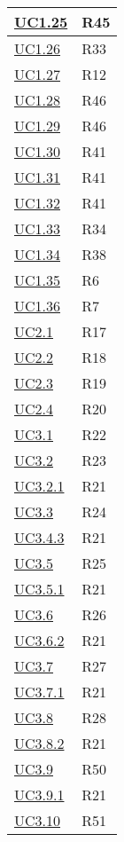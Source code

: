 \begin{longtable}{|P{6cm}|P{6cm}|}
	\hline \hyperref[UC1.25]{UC1.25} & R45 \\
	\hline \hyperref[UC1.26]{UC1.26} & R33 \\
	\hline \hyperref[UC1.27]{UC1.27} & R12 \\
	\hline \hyperref[UC1.28]{UC1.28} & R46 \\
	\hline \hyperref[UC1.29]{UC1.29} & R46 \\
	\hline \hyperref[UC1.30]{UC1.30} & R41 \\
	\hline \hyperref[UC1.31]{UC1.31} & R41 \\
	\hline \hyperref[UC1.32]{UC1.32} & R41 \\
	\hline \hyperref[UC1.33]{UC1.33} & R34 \\
	\hline \hyperref[UC1.34]{UC1.34} & R38 \\
	\hline \hyperref[UC1.35]{UC1.35} & R6 \\
	\hline \hyperref[UC1.36]{UC1.36} & R7 \\	
	\hline \hyperref[UC2.1]{UC2.1} & R17 \\
	\hline \hyperref[UC2.2]{UC2.2} & R18 \\
	\hline \hyperref[UC2.3]{UC2.3} & R19 \\
	\hline \hyperref[UC2.4]{UC2.4} & R20 \\	
	\hline \hyperref[UC3.1]{UC3.1} & R22 \\
	\hline \hyperref[UC3.2]{UC3.2} & R23 \\
	\hline \hyperref[UC3.2.1]{UC3.2.1} & R21 \\
	\hline \hyperref[UC3.3]{UC3.3} & R24 \\
	\hline \hyperref[UC3.4.3]{UC3.4.3} & R21 \\
	\hline \hyperref[UC3.5]{UC3.5} & R25 \\
	\hline \hyperref[UC3.5.1]{UC3.5.1} & R21 \\
	\hline \hyperref[UC3.6]{UC3.6} & R26 \\
	\hline \hyperref[UC3.6.2]{UC3.6.2} & R21 \\
	\hline \hyperref[UC3.7]{UC3.7} & R27 \\
	\hline \hyperref[UC3.7.1]{UC3.7.1} & R21 \\
	\hline \hyperref[UC3.8]{UC3.8} & R28 \\
	\hline \hyperref[UC3.8.2]{UC3.8.2} & R21 \\
	\hline \hyperref[UC3.9]{UC3.9} & R50 \\
	\hline \hyperref[UC3.9.1]{UC3.9.1} & R21 \\
	\hline \hyperref[UC3.10]{UC3.10} & R51 \\

\end{longtable}
